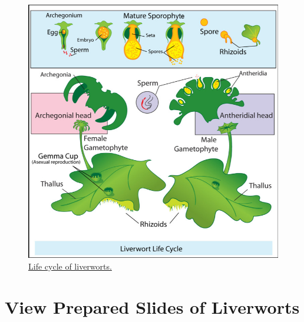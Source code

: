 \begin{figure}

{\centering \includegraphics[width=0.7\linewidth]{./figures/mosses/liverwort_life_cycle}

}

\caption{\href{https://commons.wikimedia.org/wiki/File:Liverwort_life_cycle.jpg}{Life
cycle of liverworts.}
}\label{fig:liverwort}
\end{figure}

\section{View Prepared Slides of
Liverworts}\label{view-prepared-slides-of-liverworts}

